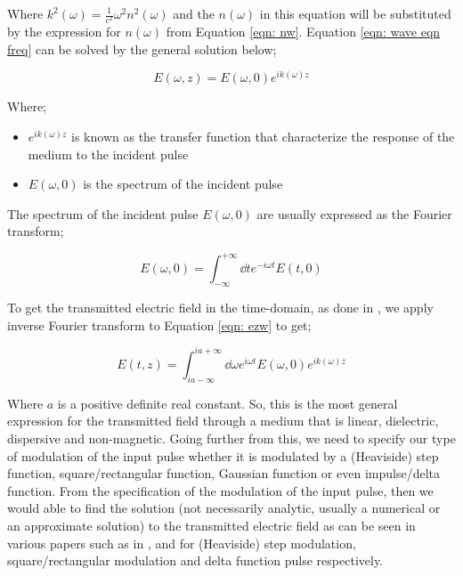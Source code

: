 Where $k^{2}(\omega) = \frac{1}{c^{2}} \omega^{2} n^{2}(\omega)$ and the $n(\omega)$ in this equation will be substituted by the expression for $n(\omega)$ from Equation \ref{eqn: nw}. Equation \ref{eqn: wave eqn freq} can be solved by the general solution below;

\begin{equation}
	E(\omega, z) = E(\omega, 0) e^{i k(\omega) z}
	\label{eqn: ezw}
\end{equation}

Where;

\begin{itemize}
	\item $e^{i k(\omega) z}$ is known as the transfer function that characterize the response of the medium to the incident pulse
	\item $E(\omega, 0)$ is the spectrum of the incident pulse
\end{itemize}

The spectrum of the incident pulse $E(\omega, 0)$ are usually expressed as the Fourier transform;

\begin{equation}
    E(\omega, 0) = \int_{-\infty}^{+\infty} \dd{t} e^{-i\omega t} E(t, 0)
\end{equation}

To get the transmitted electric field in the time-domain, as done in \cite{Jeong2011}, we apply inverse Fourier transform to Equation \ref{eqn: ezw} to get;

\begin{equation}
    E(t, z) = \int_{ia - \infty}^{ia + \infty} \dd{\omega} e^{i\omega t} E(\omega, 0) e^{i k(\omega) z}
    \label{eqn: ezta}
\end{equation}

Where $a$ is a positive definite real constant. So, this is the most general expression for the transmitted field through a medium that is linear, dielectric, dispersive and non-magnetic. Going further from this, we need to specify our type of modulation of the input pulse whether it is modulated by a (Heaviside) step function, square/rectangular function, Gaussian function or even impulse/delta function. From the specification of the modulation of the input pulse, then we would able to find the solution (not necessarily analytic, usually a numerical or an approximate solution) to the transmitted electric field as can be seen in various papers such as in \cite{Jeong2011}, \cite{Jeong2010} and \cite{Oughstun1988} for (Heaviside) step modulation, square/rectangular modulation and delta function pulse respectively.\\


